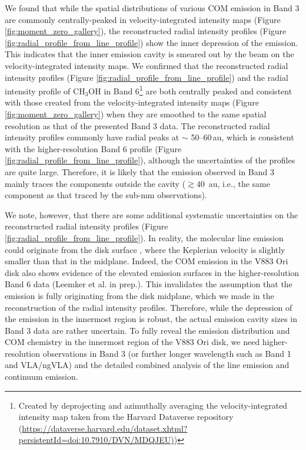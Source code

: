 \documentclass[linenumbers, twocolumn, twocolappendix, astrosymb, times]{aastex631}
\newcommand{\methanol}{CH$_3$OH\xspace}
\begin{document}
We found that while the spatial distributions of various COM emission in Band 3 are commonly centrally-peaked in velocity-integrated intensity maps (Figure \ref{fig:moment_zero_gallery}), the reconstructed radial intensity profiles (Figure \ref{fig:radial_profile_from_line_profile}) show the inner depression of the emission. This indicates that the inner emission cavity is smeared out by the beam on the velocity-integrated intensity maps. We confirmed that the reconstructed radial intensity profiles (Figure \ref{fig:radial_profile_from_line_profile}) and the radial intensity profile of \methanol in Band 6\footnote{Created by deprojecting and azimuthally averaging the velocity-integrated intensity map taken from the Harvard Dataverse repository (\url{https://dataverse.harvard.edu/dataset.xhtml?persistentId=doi:10.7910/DVN/MDQJEU)})} \citep{Tobin2023} are both centrally peaked and consistent with those created from the velocity-integrated intensity maps (Figure \ref{fig:moment_zero_gallery}) when they are smoothed to the same spatial resolution as that of the presented Band 3 data. The reconstructed radial intensity profiles commonly have radial peaks at $\sim$ 50--60\,au, which is consistent with the higher-resolution Band 6 profile (Figure \ref{fig:radial_profile_from_line_profile}), although the uncertainties of the profiles are quite large. Therefore, it is likely that the emission observed in Band 3 mainly traces the components outside the cavity ($\gtrsim 40\,$ au, i.e., the same component as that traced by the sub-mm observations). 

We note, however, that there are some additional systematic uncertainties on the reconstructed radial intensity profiles (Figure \ref{fig:radial_profile_from_line_profile}). In reality, the molecular line emission could originate from the disk surface \citep[or the warm molecular layer,][]{Aikawa2002, Law2021, Law2022, Law2023, PanequeCarreno2023}, where the Keplerian velocity is slightly smaller than that in the midplane. Indeed, the COM emission in the V883 Ori disk also shows evidence of the elevated emission surfaces in the higher-resolution Band 6 data (Leemker et al. in prep.). This invalidates the assumption that the emission is fully originating from the disk midplane, which we made in the reconstruction of the radial intensity profiles. Therefore, while the depression of the emission in the innermost region is robust, the actual emission cavity sizes in Band 3 data are rather uncertain. 
To fully reveal the emission distribution and COM chemistry in the innermost region of the V883 Ori disk, we need higher-resolution observations in Band 3 (or further longer wavelength such as Band 1 and VLA/ngVLA) and the detailed combined analysis of the line emission and continuum emission.
\end{document}
